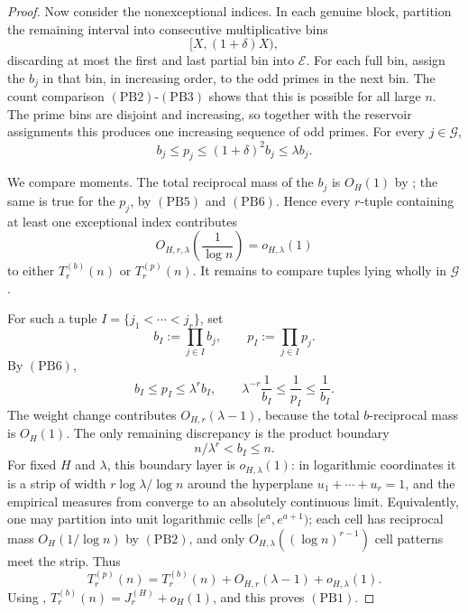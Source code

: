 \begin{proof}
Now consider the nonexceptional indices.  In each genuine block, partition the
remaining interval into consecutive multiplicative bins
\[
  [X,(1+\delta)X),
\]
discarding at most the first and last partial bin into $\mathcal E$.  For each
full bin, assign the $b_j$ in that bin, in increasing order, to the odd primes
in the next bin.  The count comparison \((\mathrm{PB2})\)-\((\mathrm{PB3})\) shows that this is
  possible for all large $n$.  The prime bins are disjoint and increasing, so
together with the reservoir assignments this produces one increasing sequence
of odd primes.  For every $j\in\mathcal G$,
\[
  b_j\le p_j\le (1+\delta)^2 b_j\le\lambda b_j.
  \tag{PB6}
\]

We compare moments.  The total reciprocal mass of the $b_j$ is $O_H(1)$ by
; the same is true for the $p_j$, by
\((\mathrm{PB5})\) and \((\mathrm{PB6})\).  Hence every $r$-tuple containing at least one
exceptional index contributes
\[
  O_{H,r,\lambda}\!\left(\frac1{\log n}\right)
  =
  o_{H,\lambda}(1)
\]
to either $T_r^{(b)}(n)$ or $T_r^{(p)}(n)$.  It remains to compare tuples
lying wholly in $\mathcal G$.

For such a tuple $I=\{j_1<\cdots<j_r\}$, set
\[
  b_I:=\prod_{j\in I}b_j,
  \qquad
  p_I:=\prod_{j\in I}p_j.
\]
By \((\mathrm{PB6})\),
\[
  b_I\le p_I\le\lambda^r b_I,
  \qquad
  \lambda^{-r}\frac1{b_I}\le\frac1{p_I}\le\frac1{b_I}.
\]
The weight change contributes $O_{H,r}(\lambda-1)$, because the total
$b$-reciprocal mass is $O_H(1)$.  The only remaining discrepancy is the
product boundary
\[
  n/\lambda^r < b_I\le n.
\]
For fixed $H$ and $\lambda$, this boundary layer is $o_{H,\lambda}(1)$: in
logarithmic coordinates it is a strip of width
$r\log\lambda/\log n$ around the hyperplane
$u_1+\cdots+u_r=1$, and the empirical measures from
 converge to an absolutely continuous limit.
Equivalently, one may partition into unit logarithmic cells
$[e^a,e^{a+1})$; each cell has reciprocal mass $O_H(1/\log n)$ by
\((\mathrm{PB2})\), and only $O_{H,\lambda}((\log n)^{r-1})$ cell patterns meet the
strip.  Thus
\[
  T_r^{(p)}(n)
  =
  T_r^{(b)}(n)+O_{H,r}(\lambda-1)+o_{H,\lambda}(1).
\]
Using ,
$T_r^{(b)}(n)=J_r^{(H)}+o_H(1)$, and this proves \((\mathrm{PB1})\).


\end{proof}
